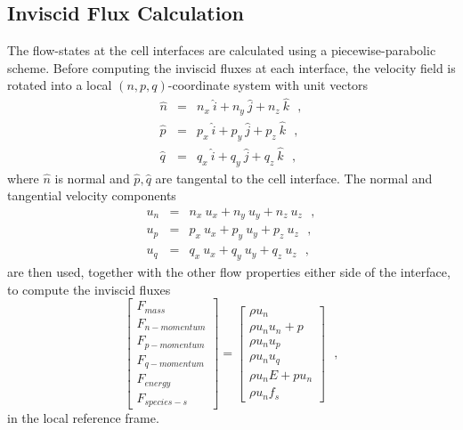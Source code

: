 \subsection{Inviscid Flux Calculation}
%
The flow-states at the cell interfaces are calculated using a piecewise-parabolic scheme.
Before computing the inviscid fluxes at each interface, 
the velocity field is rotated into a local $(n,p,q)$-coordinate system
with unit vectors
%
\begin{eqnarray}
   \hat{n} & = & n_x ~ \hat{i} + n_y ~ \hat{j} + n_z ~ \hat{k} ~~~, \nonumber \\
   \hat{p} & = & p_x ~ \hat{i} + p_y ~ \hat{j} + p_z ~ \hat{k} ~~~, \nonumber \\
   \hat{q} & = & q_x ~ \hat{i} + q_y ~ \hat{j} + q_z ~ \hat{k} ~~~,
\end{eqnarray}
%
where $\hat{n}$ is normal and $\hat{p}, \hat{q}$ are tangental to the cell interface.
The normal and tangential velocity components
%
\begin{eqnarray}
   u_n & = & n_x ~ u_x + n_y ~ u_y + n_z ~ u_z ~~~, \nonumber \\
   u_p & = & p_x ~ u_x + p_y ~ u_y + p_z ~ u_z ~~~, \nonumber \\
   u_q & = & q_x ~ u_x + q_y ~ u_y + q_z ~ u_z ~~~,
\end{eqnarray}
%
are then used, together with the other flow properties either side of the interface, 
to compute the inviscid fluxes
%
\begin{equation}
\label{local-flux-vector-eqn}
   \left[
   \begin{array}{l}
      F_{mass} \\
      F_{n-momentum} \\
      F_{p-momentum} \\
      F_{q-momentum} \\
      F_{energy} \\
      F_{species-s}
   \end{array}
   \right]
   =
   \left[
   \begin{array}{l}
      \rho u_n \\
      \rho u_n u_n + p \\
      \rho u_n u_p \\
      \rho u_n u_q \\
      \rho u_n E + p u_n \\
      \rho u_n f_s
   \end{array}
   \right] ~~~,
\end{equation}
%
in the local reference frame.
